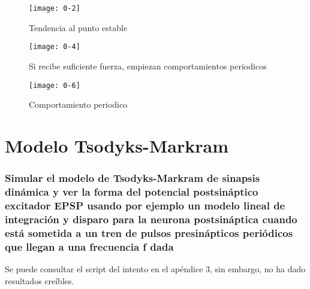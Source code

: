 \begin{figure}
	\centering
	\texttt{[image: 0-2]}
	\caption{Tendencia al punto estable}
	\label{2fn}
\end{figure}

\begin{figure}
	\centering
	\texttt{[image: 0-4]}
	\caption{Si recibe suficiente fuerza, empiezan comportamientos periodicos}
	\label{3fn}
\end{figure}

\begin{figure}
	\centering
	\texttt{[image: 0-6]}
	\caption{Comportamiento periodico}
	\label{4fn}
\end{figure}

\section{Modelo Tsodyks-Markram}

\subsubsection{\large Simular el modelo de Tsodyks-Markram de sinapsis dinámica y ver la forma del potencial postsináptico excitador EPSP usando por ejemplo un modelo lineal de integración y disparo para la neurona postsináptica cuando está sometida a un tren de pulsos presinápticos periódicos que llegan a una frecuencia f dada} 
Se puede consultar el script del intento en el apéndice 3, sin embargo, no ha dado resultados creíbles.










